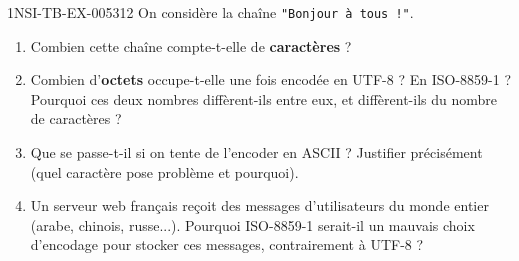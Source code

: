 \begin{exercice}{1NSI-TB-EX-005}{3}{12}
On considère la chaîne \lstinline{"Bonjour à tous !"}.
\begin{enumerate}
  \item Combien cette chaîne compte-t-elle de \textbf{caractères} ?
  \item Combien d'\textbf{octets} occupe-t-elle une fois encodée en UTF-8 ? En ISO-8859-1 ? Pourquoi ces deux nombres diffèrent-ils entre eux, et diffèrent-ils du nombre de caractères ?
  \item Que se passe-t-il si on tente de l'encoder en ASCII ? Justifier précisément (quel caractère pose problème et pourquoi).
  \item Un serveur web français reçoit des messages d'utilisateurs du monde entier (arabe, chinois, russe...). Pourquoi ISO-8859-1 serait-il un mauvais choix d'encodage pour stocker ces messages, contrairement à UTF-8 ?
\end{enumerate}
\end{exercice}
